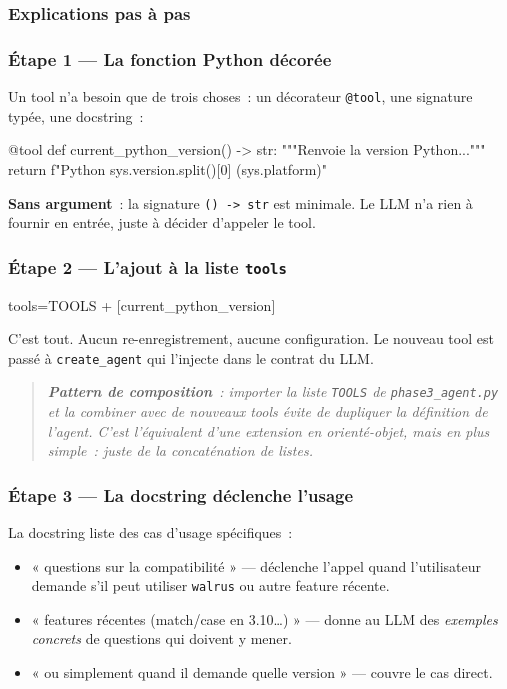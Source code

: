 \documentclass[11pt,a4paper]{article}
\begin{document}
\subsubsection{Explications pas à pas}

\subsubsection*{Étape 1 — La fonction Python décorée}

Un tool n'a besoin que de trois choses~: un décorateur \texttt{@tool},
une signature typée, une docstring~:

\begin{pythoncode}
@tool
def current_python_version() -> str:
    """Renvoie la version Python..."""
    return f"Python {sys.version.split()[0]} ({sys.platform})"
\end{pythoncode}

\textbf{Sans argument}~: la signature \texttt{() -> str} est minimale.
Le LLM n'a rien à fournir en entrée, juste à décider d'appeler le tool.

\subsubsection*{Étape 2 — L'ajout à la liste \texttt{tools}}

\begin{pythoncode}
tools=TOOLS + [current_python_version]
\end{pythoncode}

C'est tout. Aucun re-enregistrement, aucune configuration. Le nouveau
tool est passé à \texttt{create\_agent} qui l'injecte dans le contrat
du LLM.

\begin{quote}\itshape
\textbf{Pattern de composition}~: importer la liste \texttt{TOOLS} de
\texttt{phase3\_agent.py} et la combiner avec de nouveaux tools évite
de dupliquer la définition de l'agent. C'est l'équivalent d'une
\emph{extension} en orienté-objet, mais en plus simple~: juste de la
concaténation de listes.
\end{quote}

\subsubsection*{Étape 3 — La docstring déclenche l'usage}

La docstring liste des cas d'usage spécifiques~:
\begin{itemize}[leftmargin=*]
  \item « questions sur la compatibilité » — déclenche l'appel quand
        l'utilisateur demande s'il peut utiliser \texttt{walrus} ou autre
        feature récente.
  \item « features récentes (match/case en 3.10\dots) » — donne au LLM
        des \emph{exemples concrets} de questions qui doivent y mener.
  \item « ou simplement quand il demande quelle version » — couvre le
        cas direct.
\end{itemize}
\end{document}
